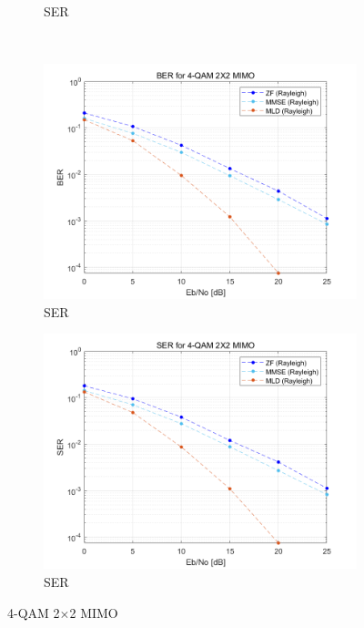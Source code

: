 \documentclass{article}
\begin{document}
\begin{figure}[H]
\begin{subfigure}{0.5\textwidth}
		\caption{SER}
	\end{subfigure}\\%
	\begin{subfigure}{0.5\textwidth}
		\centerline{\includegraphics[width=1\textwidth]{a_Eb_BER.png}}
		\caption{SER}
	\end{subfigure}%
	\begin{subfigure}{0.5\textwidth}
		\centerline{\includegraphics[width=1\textwidth]{a_Eb_SER.png}}
		\caption{SER}
	\end{subfigure}%
	\caption{4-QAM 2$\times$2 MIMO}
\end{figure}
\end{document}
